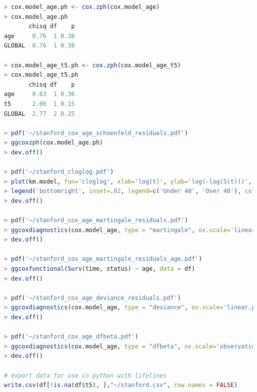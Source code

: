 \begin{lstlisting}[language=R]
> cox.model_age.ph <- cox.zph(cox.model_age)
> cox.model_age.ph
       chisq df    p
age     0.76  1 0.38
GLOBAL  0.76  1 0.38

> cox.model_age_t5.ph <- cox.zph(cox.model_age_t5)
> cox.model_age_t5.ph
       chisq df    p
age     0.83  1 0.36
t5      2.06  1 0.15
GLOBAL  2.77  2 0.25

> pdf('~/stanford_cox_age_schoenfeld_residuals.pdf')
> ggcoxzph(cox.model_age.ph)
> dev.off()

> pdf('~/stanford_cloglog.pdf')
> plot(km.model, fun='cloglog', xlab='log(t)', ylab='log(-log(S(t)))', col=c('#4e79a7', '#f28e2b'))
> legend('bottomright', inset=.02, legend=c('Under 40', 'Over 40'), col=c('#4e79a7', '#f28e2b'), lty=1:2, box.lty=0)
> dev.off()

> pdf('~/stanford_cox_age_martingale_residuals.pdf')
> ggcoxdiagnostics(cox.model_age, type = "martingale", ox.scale='linear.predictions')
> dev.off()

> pdf('~/stanford_cox_age_martingale_residuals_age.pdf')
> ggcoxfunctional(Surv(time, status) ~ age, data = df)
> dev.off()

> pdf('~/stanford_cox_age_deviance_residuals.pdf')
> ggcoxdiagnostics(cox.model_age, type = "deviance", ox.scale='linear.predictions')
> dev.off()

> pdf('~/stanford_cox_age_dfbeta.pdf')
> ggcoxdiagnostics(cox.model_age, type = "dfbeta", ox.scale='observation.id')
> dev.off()

# export data for use in python with lifelines
write.csv(df[!is.na(df$t5), ],"~/stanford.csv", row.names = FALSE)
\end{lstlisting}

